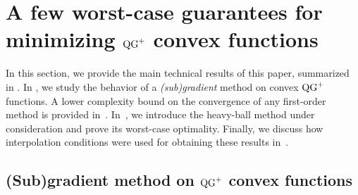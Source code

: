     
    \section{\texorpdfstring{A few worst-case guarantees for minimizing $\operatorname{QG}^+$ convex functions}{A few worst-case guarantees for minimizing QG+ convex functions}} \label{sec:algorithms_and_worst-case_analyses}

        In this section, we provide the main technical results of this paper, summarized in . In , we study the behavior of a \emph{(sub)gradient} method on convex $\operatorname{QG}^+$ functions. A lower complexity bound on the convergence of any first-order method
        is provided in~. In~, we introduce the heavy-ball method under consideration and prove its worst-case optimality. Finally, we discuss how interpolation conditions were used for obtaining these results in~.
        
        \subsection{\texorpdfstring{(Sub)gradient method on $\operatorname{QG}^+$ convex functions}{(Sub)gradient method on QG+ convex functions}}\label{subsec:subgradient_method_on_qg+convex_functions}
        
